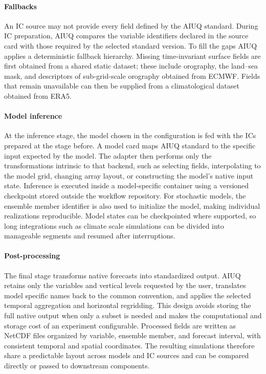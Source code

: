 \paragraph{Fallbacks} \label{fallbacks}
An IC source may not provide every field defined by the AIUQ standard. During IC preparation, AIUQ compares the variable identifiers declared in the source card with those required by the selected standard version. To fill the gaps AIUQ applies a deterministic fallback hierarchy. Missing time-invariant surface fields are first obtained from a shared static dataset; these include orography, the land--sea mask, and descriptors of sub-grid-scale orography obtained from ECMWF. Fields that remain unavailable can then be supplied from a climatological dataset obtained from ERA5. 

\paragraph{Model inference} \label{model-inference}

At the inference stage, the model chosen in the configuration is fed with the ICs prepared at the stage before. A model card maps AIUQ standard to the specific input expected by the model. The adapter then performs only the transformations intrinsic to that backend, such as selecting fields, interpolating to the model grid, changing array layout, or constructing the model's native input state. Inference is executed inside a model-specific container using a versioned checkpoint stored outside the workflow repository. For stochastic models, the ensemble member identifier is also used to initialize the model, making individual realizations reproducible. Model states can be checkpointed where supported, so long integrations such as climate scale simulations can be divided into manageable segments and resumed after interruptions.

\paragraph{Post-processing} \label{post-processing}

The final stage transforms native forecasts into standardized output. AIUQ retains only the variables and vertical levels requested by the user, translates model specific names back to the common convention, and applies the selected temporal aggregation and horizontal regridding. This design avoids storing the full native output when only a subset is needed and makes the computational and storage cost of an experiment configurable. Processed fields are written as NetCDF files organized by variable, ensemble member, and forecast interval, with consistent temporal and spatial coordinates. The resulting simulations therefore share a predictable layout across models and IC sources and can be compared directly or passed to downstream components.


